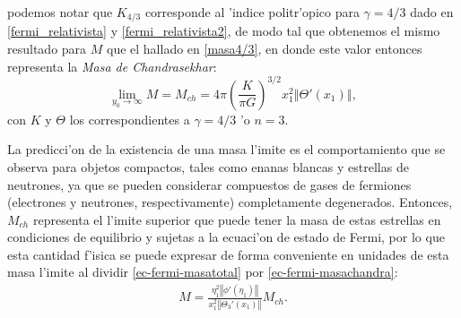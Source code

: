 podemos notar que $K_{4/3}$ corresponde al 'indice politr'opico para $\gamma=4/3$ dado en \eqref{fermi_relativista} y \eqref{fermi_relativista2}, de modo tal que obtenemos el mismo resultado para $M$ que el hallado en \eqref{masa4/3}, en donde este valor entonces representa la \emph{Masa de Chandrasekhar}:
\begin{equation}\label{masachandra2}
\boxed{\lim_{y_0\to\infty}M=M_{ch}=4\pi\left(\frac{K}{\pi G}\right)^{3/2}x_1^2\left\Vert\Theta'(x_1)\right\Vert},
\end{equation}
con $K$ y $\Theta$ los correspondientes a $\gamma=4/3$ 'o $n=3$.

La predicci'on de la existencia de una masa l'imite es el comportamiento que se observa para objetos compactos, tales como enanas blancas y estrellas de neutrones, ya que se pueden considerar compuestos de gases de fermiones (electrones y neutrones, respectivamente) completamente degenerados. Entonces, $M_{ch}$ representa el l'imite superior que puede tener la masa de estas estrellas en condiciones de equilibrio y sujetas a la ecuaci'on de estado de Fermi, por lo que esta cantidad f'isica se puede expresar de forma conveniente en unidades de esta masa l'imite al dividir \eqref{ec-fermi-masatotal} por \eqref{ec-fermi-masachandra}:
\begin{align}\label{ec-fermi-masa-masachandra}
 \boxed{M=\frac{\eta_1^2\left\Vert\phi'(\eta_1)\right\Vert}{x_1^2\left\Vert\Theta_3'(x_1)\right\Vert}M_{ch}.}
\end{align}

